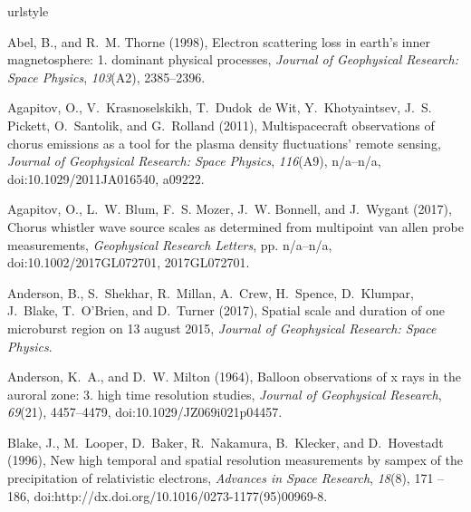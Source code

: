 \documentclass[draft,linenumbers]{agujournal}
\begin{document}

\begin{thebibliography}{35}
\providecommand{\natexlab}[1]{#1}
\expandafter\ifx\csname urlstyle\endcsname\relax
  \providecommand{\doi}[1]{doi:\discretionary{}{}{}#1}\else
  \providecommand{\doi}{doi:\discretionary{}{}{}\begingroup
  \urlstyle{rm}\Url}\fi

Abel, B., and R.~M. Thorne (1998), Electron scattering loss in earth's inner
  magnetosphere: 1. dominant physical processes, \textit{Journal of Geophysical
  Research: Space Physics}, \textit{103}(A2), 2385--2396.

Agapitov, O., V.~Krasnoselskikh, T.~Dudok~de Wit, Y.~Khotyaintsev, J.~S.
  Pickett, O.~Santolik, and G.~Rolland (2011), Multispacecraft observations of
  chorus emissions as a tool for the plasma density fluctuations' remote
  sensing, \textit{Journal of Geophysical Research: Space Physics},
  \textit{116}(A9), n/a--n/a, \doi{10.1029/2011JA016540}, a09222.

Agapitov, O., L.~W. Blum, F.~S. Mozer, J.~W. Bonnell, and J.~Wygant (2017),
  Chorus whistler wave source scales as determined from multipoint van allen
  probe measurements, \textit{Geophysical Research Letters}, pp. n/a--n/a,
  \doi{10.1002/2017GL072701}, 2017GL072701.

Anderson, B., S.~Shekhar, R.~Millan, A.~Crew, H.~Spence, D.~Klumpar, J.~Blake,
  T.~O'Brien, and D.~Turner (2017), Spatial scale and duration of one
  microburst region on 13 august 2015, \textit{Journal of Geophysical Research:
  Space Physics}.

Anderson, K.~A., and D.~W. Milton (1964), Balloon observations of x rays in the
  auroral zone: 3. high time resolution studies, \textit{Journal of Geophysical
  Research}, \textit{69}(21), 4457--4479, \doi{10.1029/JZ069i021p04457}.

Blake, J., M.~Looper, D.~Baker, R.~Nakamura, B.~Klecker, and D.~Hovestadt
  (1996), New high temporal and spatial resolution measurements by sampex of
  the precipitation of relativistic electrons, \textit{Advances in Space
  Research}, \textit{18}(8), 171 -- 186,
  \doi{http://dx.doi.org/10.1016/0273-1177(95)00969-8}.


\end{thebibliography}
\end{document}
